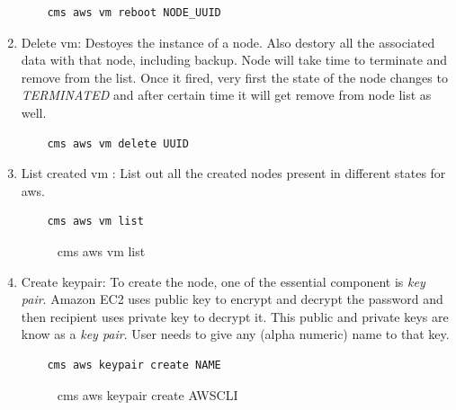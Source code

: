 \documentclass[9pt,twocolumn,twoside]{../../styles/osajnl}
\begin{document}
\begin{enumerate}
    \begin{verbatim}
    cms aws vm reboot NODE_UUID
    \end{verbatim}
    
    \item Delete vm: Destoyes the instance of a node. Also destory all the associated data with that node, including backup. Node will take time to terminate and remove from the list. Once it fired, very first the state of the node changes to \textit{TERMINATED} and after certain time it will get remove from node list as well. 
    
    \begin{verbatim}
    cms aws vm delete UUID
    \end{verbatim}
    
    \item List created vm : List out all the created nodes present in different states for aws.
    
    \begin{verbatim}
    cms aws vm list
    \end{verbatim}
    
     \begin{figure}[h!]
    	\centering
    	\caption{cms aws vm list }
    	\label{fig:vmlist}
    \end{figure}

    \item Create keypair: To create the node, one of the essential component is \textit{key pair}. Amazon EC2 uses public key to encrypt and decrypt the password and then recipient uses private key to decrypt it. This public and private keys are know as a \textit{key pair}. User needs to give any (alpha numeric) name to that key.
    
    \begin{verbatim}
    cms aws keypair create NAME
    \end{verbatim}
    
    \begin{figure}[h!]
    	\centering
    	\caption{cms aws keypair create AWSCLI}
    	\label{fig:keypaircreate}
    \end{figure}


\end{enumerate}
\end{document}
